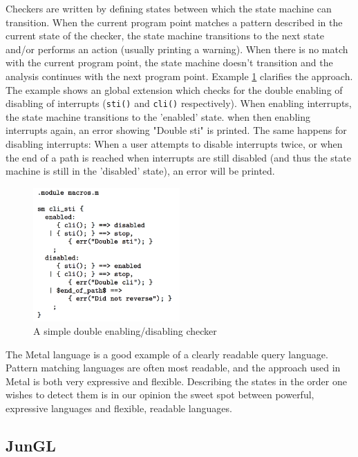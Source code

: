 Checkers are written by defining states between which the state machine can transition. When the current program point matches a pattern described in the current state of the checker, the state machine transitions to the next state and/or performs an action (usually printing a warning). When there is no match with the current program point, the state machine doesn't transition and the analysis continues with the next program point. Example \ref{fig:Metal} clarifies the approach. The example shows an global extension which checks for the double enabling of disabling of interrupts (\texttt{sti()} and \texttt{cli()} respectively). When enabling interrupts, the state machine transitions to the 'enabled' state. when then enabling interrupts again, an error showing "Double sti" is printed. The same happens for disabling interrupts: When a user attempts to disable interrupts twice, or when the end of a path is reached when interrupts are still disabled (and thus the state machine is still in the 'disabled' state), an error will be printed.

\begin{figure}[!ht]
    \centering
      \includegraphics[width=0.5\textwidth]{images/Metal} 
      \caption{A simple double enabling/disabling checker}
    \label{fig:Metal}
\end{figure}

The Metal language is a good example of a clearly readable query language. Pattern matching languages are often most readable, and the approach used in Metal is both very expressive and flexible. Describing the states in the order one wishes to detect them is in our opinion the sweet spot between powerful, expressive languages and flexible, readable languages.

\subsection*{JunGL}

